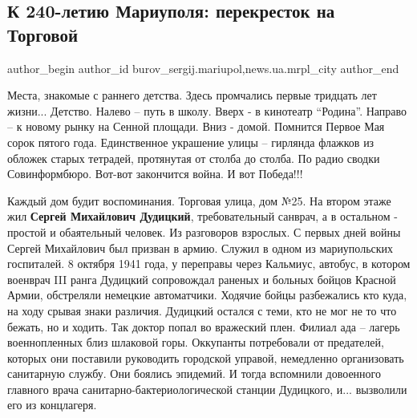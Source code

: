  
 
 
 
 
 
\subsection{К 240-летию Мариуполя: перекресток на Торговой}
\label{sec:08_09_2018.stz.news.ua.mrpl_city.1.k_240_letiu_mariupolja_perekrestok_na_torgovoj}
 
\ifcmt
 author_begin
   author_id burov_sergij.mariupol,news.ua.mrpl_city
 author_end
\fi

Места, знакомые с раннего детства. Здесь промчались первые тридцать лет жизни...
Детство. Налево – путь в школу. Вверх - в кинотеатр \enquote{Родина}. Направо – к
новому рынку на Сенной площади. Вниз - домой. Помнится Первое Мая сорок пятого
года. Единственное украшение улицы – гирлянда флажков из обложек старых
тетрадей, протянутая от столба до столба. По радио сводки Совинформбюро.
Вот-вот закончится война. И вот Победа!!!

Каждый дом будит воспоминания. Торговая улица, дом №25. На втором этаже жил
\textbf{Сергей Михайлович Дудицкий}, требовательный санврач, а в остальном - простой и
обаятельный человек. Из разговоров взрослых. С первых дней войны Сергей
Михайлович был призван в армию. Служил в одном из мариупольских госпиталей. 8
октября 1941 года, у переправы через Кальмиус, автобус, в котором военврач III
ранга Дудицкий сопровождал раненых и больных бойцов Красной Армии, обстреляли
немецкие автоматчики. Ходячие бойцы разбежались кто куда, на ходу срывая знаки
различия. Дудицкий остался с теми, кто не мог не то что бежать, но и ходить.
Так доктор попал во вражеский плен. Филиал ада – лагерь военнопленных близ
шлаковой горы. Оккупанты потребовали от предателей, которых они поставили
руководить городской управой, немедленно организовать санитарную службу. Они
боялись эпидемий. И тогда вспомнили довоенного главного врача
санитарно-бактериологической станции Дудицкого, и... вызволили его из концлагеря.

